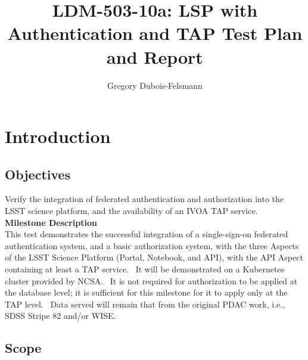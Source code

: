 \documentclass[DM,lsstdraft,STR,toc]{lsstdoc}
\begin{document}
\def\milestoneName{LSP with Authentication and TAP}
\def\milestoneId{LDM-503-10a:}
\def\product{LSP Services}


\title{ LDM-503-10a: LSP with Authentication and TAP Test Plan and Report}
\setDocRef{\lsstDocType-\lsstDocNum}
\date{\vcsdate}
\author{ Gregory Dubois-Felsmann }






\maketitle

\section{Introduction}
\label{sect:intro}


\subsection{Objectives}
\label{sect:objectives}

Verify the integration of federated authentication and authorization
into the LSST science platform, and the availability of an IVOA TAP
service.\\[2\baselineskip]\textbf{Milestone
Description}\\[2\baselineskip]This test demonstrates the successful
integration of a single-sign-on federated authentication system, and a
basic authorization system, with the three Aspects of the LSST Science
Platform (Portal, Notebook, and API), with the API Aspect containing at
least a TAP service. ~It will be demonstrated on a Kubernetes cluster
provided by NCSA. ~It is not required for authorization to be applied at
the database level; it is sufficient for this milestone for it to apply
only at the TAP level. ~Data served will remain that from the original
PDAC work, i.e., SDSS Stripe 82 and/or WISE.\\[2\baselineskip]

\subsection{Scope}\label{scope}
\end{document}

